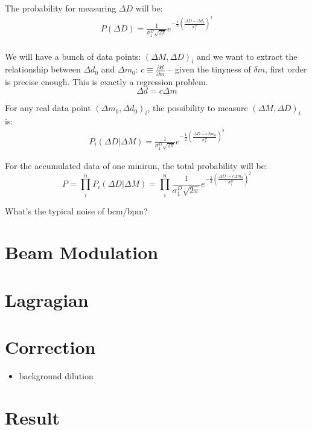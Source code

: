 The probability for measuring $\Delta D$ will be:
\begin{equation*}
    \begin{gathered}
	P(\Delta D) = \frac{1}{\sigma_1^D\sqrt{2\pi}} e^{-\frac{1}{2}\left( \frac{\Delta D - \Delta d_0}{\sigma_1^D}\right)^2}    \\
    \end{gathered}
\end{equation*}

We will have a bunch of data points: $(\Delta M, \Delta D)_i$ and we want to
extract the relationship between $\Delta d_0$ and $\Delta m_0$: 
$c \equiv \frac{\partial d}{\partial m}$ -- given the tinyness of $\delta m$, first
order is precise enough. This is exactly a regression problem.
$$ \Delta d = c \Delta m $$

For any real data point $(\Delta m_0, \Delta d_0)_i$, the possibility to measure
$(\Delta M, \Delta D)_i$ is:
\begin{equation*}
    \begin{gathered}
	P_i(\Delta D|\Delta M) = \frac{1}{\sigma_1^D\sqrt{2\pi}} 
	    e^{-\frac{1}{2}\left( \frac{\Delta D - c\Delta m_0}{\sigma_1^D}\right)^2}
    \end{gathered}
\end{equation*}

For the accumulated data of one minirun, the total probability will be:
\begin{equation*}
    P = \prod_i^n P_i(\Delta D|\Delta M) = \prod_i^n \frac{1}{\sigma_1^D\sqrt{2\pi}} 
	    e^{-\frac{1}{2}\left( \frac{\Delta D_i - c\Delta m_0}{\sigma_1^D}\right)^2}
\end{equation*}

What's the typical noise of bcm/bpm?


\section{Beam Modulation}

\section{Lagragian}

\section{Correction}
\begin{itemize}
    \item background dilution
\end{itemize}
\section{Result}
